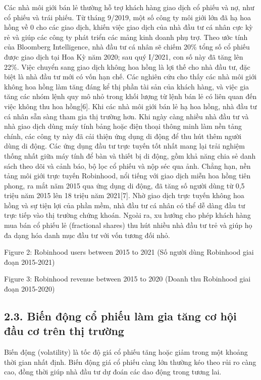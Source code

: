 Các nhà môi giới bán lẻ thường hỗ trợ khách hàng giao dịch cổ phiếu và nợ, như cổ phiếu và trái phiếu. Từ tháng 9/2019, một số công ty môi giới lớn đã hạ hoa hồng về 0 cho các giao dịch, khiến việc giao dịch của nhà đầu tư cá nhân cực kỳ rẻ và giúp các công ty phát triển các mảng kinh doanh phụ trợ. Theo ước tính của Bloomberg Intelligence, nhà đầu tư cá nhân sẽ chiếm 20\% tổng số cổ phiếu được giao dịch tại Hoa Kỳ năm 2020; sau quý I/2021, con số này đã tăng lên 22\%. Việc chuyển sang giao dịch không hoa hồng là lợi thế cho nhà đầu tư, đặc biệt là nhà đầu tư mới có vốn hạn chế. Các nghiên cứu cho thấy các nhà môi giới không hoa hồng làm tăng đáng kể thị phần tài sản của khách hàng, và việc gia tăng các nhóm lệnh quy mô nhỏ trong khối lượng từ lệnh bán lẻ có liên quan đến việc không thu hoa hồng{[}6{]}. Khi các nhà môi giới bán lẻ hạ hoa hồng, nhà đầu tư cá nhân sẵn sàng tham gia thị trường hơn. Khi ngày càng nhiều nhà đầu tư và nhà giao dịch dùng máy tính bảng hoặc điện thoại thông minh làm nền tảng chính, các công ty này đã cải thiện ứng dụng di động để thu hút thêm người dùng di động. Các ứng dụng đầu tư trực tuyến tốt nhất mang lại trải nghiệm thống nhất giữa máy tính để bàn và thiết bị di động, gồm khả năng chia sẻ danh sách theo dõi và cảnh báo, bộ lọc cổ phiếu và nộp séc qua ảnh. Chẳng hạn, nền tảng môi giới trực tuyến Robinhood, nổi tiếng với giao dịch miễn hoa hồng tiên phong, ra mắt năm 2015 qua ứng dụng di động, đã tăng số người dùng từ 0,5 triệu năm 2015 lên 18 triệu năm 2021{[}7{]}. Nhờ giao dịch trực tuyến không hoa hồng và sự tiện lợi của phần mềm, nhà đầu tư cá nhân có thể dễ dàng đầu tư trực tiếp vào thị trường chứng khoán. Ngoài ra, xu hướng cho phép khách hàng mua bán cổ phiếu lẻ (fractional shares) thu hút nhiều nhà đầu tư trẻ và giúp họ đa dạng hóa danh mục đầu tư với vốn tương đối nhỏ.

Figure 2: Robinhood users between 2015 to 2021 (Số người dùng Robinhood giai đoạn 2015-2021)

Figure 3: Robinhood revenue between 2015 to 2020 (Doanh thu Robinhood giai đoạn 2015-2020)

\subsection{2.3. Biến động cổ phiếu làm gia tăng cơ hội đầu cơ trên thị trường}

Biến động (volatility) là tốc độ giá cổ phiếu tăng hoặc giảm trong một khoảng thời gian nhất định. Biến động giá cổ phiếu càng lớn thường kéo theo rủi ro càng cao, đồng thời giúp nhà đầu tư dự đoán các dao động trong tương lai.

